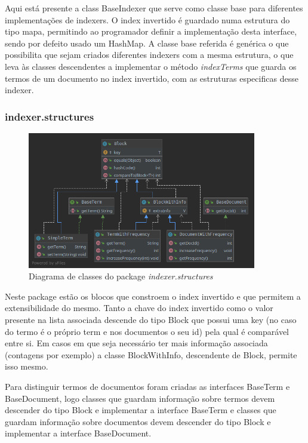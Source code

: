 \documentclass[12pt]{article}
\begin{document}
Aqui está presente a class BaseIndexer que serve como classe base para
diferentes implementações de indexers. O index invertido é guardado numa
estrutura do tipo mapa, permitindo ao programador definir a implementação
desta interface, sendo por defeito usado um HashMap. A classe base referida
é genérica o que possibilita que sejam criados diferentes indexers com a
mesma estrutura, o que leva às classes descendentes a implementar o método
{\it indexTerms} que guarda os termos de um documento no index invertido,
com as estruturas especificas desse indexer.

\subsubsection{indexer.structures}
\begin{figure}[h]
  \center
  \includegraphics[width=10cm]{packages_indexer_structures.png}
  \caption{Diagrama de classes do package \it indexer.structures}
\end{figure}

Neste package estão os blocos que constroem o index invertido e que permitem
a extensibilidade do mesmo. Tanto a chave do index invertido como o valor presente
na lista associada descende do tipo Block que possui uma key (no caso do termo é o
próprio term e nos documentos o seu id) pela qual é comparável entre si. Em casos
em que seja necessário ter mais informação associada (contagens por exemplo)
a classe BlockWithInfo, descendente de Block, permite isso mesmo.

Para distinguir termos de documentos foram criadas as interfaces BaseTerm e BaseDocument,
logo classes que guardam informação sobre termos devem descender do tipo Block e
implementar a interface BaseTerm e classes que guardam informação sobre documentos
devem descender do tipo Block e implementar a interface BaseDocument.
\end{document}
